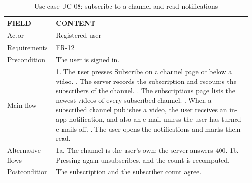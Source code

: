\begin{table}[H]
\centering
\caption{Use case UC-08: subscribe to a channel and read notifications}
\label{tab:uc-subscribe}
\small
\begin{tabularx}{\textwidth}{p{} X}
\toprule
\textbf{FIELD} & \textbf{CONTENT} \\
\midrule
Actor & Registered user \\
Requirements & FR-12 \\
Precondition & The user is signed in. \\
Main flow &
  1. The user presses Subscribe on a channel page or below a video. \newline
  2. The server records the subscription and recounts the subscribers of the channel. \newline
  3. The subscriptions page lists the newest videos of every subscribed channel. \newline
  4. When a subscribed channel publishes a video, the user receives an in-app notification, and also an e-mail unless the user has turned e-mails off. \newline
  5. The user opens the notifications and marks them read. \\
Alternative flows &
  1a. The channel is the user's own: the server answers 400. \newline
  1b. Pressing again unsubscribes, and the count is recomputed. \\
Postcondition & The subscription and the subscriber count agree. \\
\bottomrule
\end{tabularx}
\end{table}

